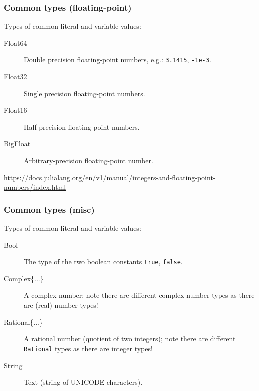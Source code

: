 \documentclass[english,serif,mathserif,xcolor=pdftex,dvipsnames,table]{beamer}
\begin{document}
\begin{frame}[fragile]
  \frametitle{Common types (floating-point)}

  Types of common literal and variable values:
  \begin{description}
  \item[Float64] Double precision floating-point numbers, e.g.:
    \texttt{3.1415}, \texttt{-1e-3}.
  \item[Float32] Single precision floating-point numbers.
  \item[Float16] Half-precision floating-point numbers.
  \item[BigFloat] Arbitrary-precision floating-point number.
  \end{description}

  \+
  \begin{references}
    \url{https://docs.julialang.org/en/v1/manual/integers-and-floating-point-numbers/index.html}
  \end{references}
\end{frame}


\begin{frame}[fragile]
  \frametitle{Common types (misc)}

  Types of common literal and variable values:
  \begin{description}
  \item[Bool] The type of the two boolean constants \texttt{true}, \texttt{false}.
  \item[Complex\{...\}] A complex number; note there are different
    complex number types as there are (real) number types!
  \item[Rational\{...\}] A rational number (quotient of two integers);
    note there are different \texttt{Rational} types as there are
    integer types!
  \item[String] Text (string of UNICODE characters).
  \end{description}
\end{frame}
\end{document}
